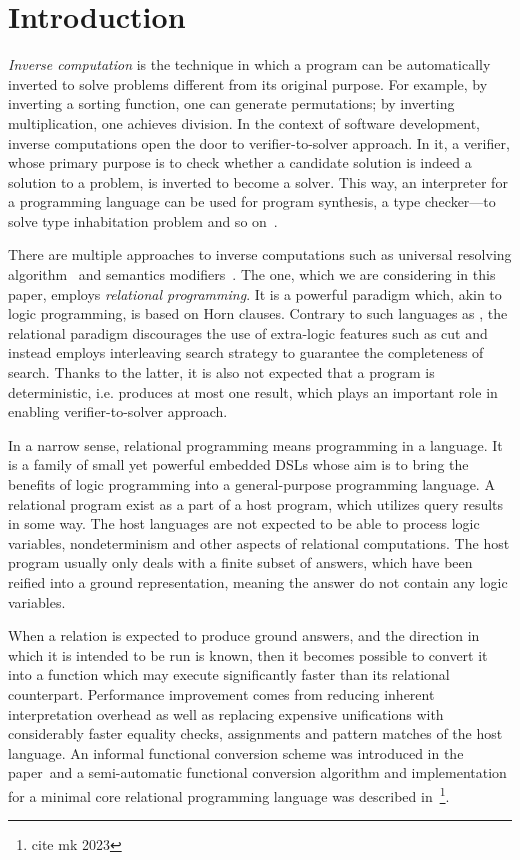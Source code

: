 \section{Introduction}

\emph{Inverse computation} is the technique in which a program can be automatically inverted to solve problems different from its original purpose.
For example, by inverting a sorting function, one can generate permutations; by inverting multiplication, one achieves division.
In the context of software development, inverse computations open the door to verifier-to-solver approach.
In it, a verifier, whose primary purpose is to check whether a candidate solution is indeed a solution to a problem, is inverted to become a solver.
This way, an interpreter for a programming language can be used for program synthesis, a type checker---to solve type inhabitation problem and so on~\cite{Untagged, lozov2019relational}.

There are multiple approaches to inverse computations such as universal resolving algorithm~\cite{RevURA} and semantics modifiers~\cite{SemanticsModifiers1}.
The one, which we are considering in this paper, employs \emph{relational programming}.
It is a powerful paradigm which, akin to logic programming, is based on Horn clauses.
Contrary to such languages as \prolog, the relational paradigm discourages the use of extra-logic features such as cut and instead employs interleaving search strategy to guarantee the completeness of search.
Thanks to the latter, it is also not expected that a program is deterministic, i.e. produces at most one result, which plays an important role in enabling verifier-to-solver approach.

In a narrow sense, relational programming means programming in a \mk language.
It is a family of small yet powerful embedded DSLs whose aim is to bring the benefits of logic programming into a general-purpose programming language.
A relational program exist as a part of a host program, which utilizes query results in some way.
The host languages are not expected to be able to process logic variables, nondeterminism and other aspects of relational computations.
The host program usually only deals with a finite subset of answers, which have been reified into a ground representation, meaning the answer do not contain any logic variables.

When a relation is expected to produce ground answers, and the direction in which it is intended to be run is known, then it becomes possible to convert it into a function which may execute significantly faster than its relational counterpart.
Performance improvement comes from reducing inherent interpretation overhead as well as replacing expensive unifications with considerably faster equality checks, assignments and pattern matches of the host language.
An informal functional conversion scheme was introduced in the paper~\cite{verbitskaia2022direction}and a semi-automatic functional conversion algorithm and implementation for a minimal core relational programming language \micro was described in~\footnote{cite mk 2023}.

